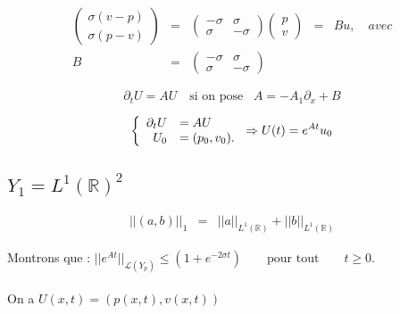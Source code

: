 \documentclass[a4paper,11pt]{article}
\begin{document}
\begin{equation*}
\begin{array}{rclcl}
    \begin{pmatrix}
        \sigma(v-p) \\
        \sigma(p-v)
    \end{pmatrix} &=&
    \begin{pmatrix}
        -\sigma & \sigma \\
        \sigma & -\sigma
    \end{pmatrix}
    \begin{pmatrix}
        p \\
        v
    \end{pmatrix} &=&
    Bu, \quad avec \\
    B &=&
    \begin{pmatrix}
        -\sigma & \sigma \\
        \sigma & -\sigma
    \end{pmatrix} & &
\end{array}
\end{equation*}

\begin{displaymath}
    \partial_t U = AU \,\,\,\,\,\, \mbox{si on pose}\,\,\,\,\, A=-A_1\partial_x + B
\end{displaymath}

\begin{displaymath}
    \left\{
    \begin{array}{rl}
        \partial_t U &=AU\\
        U_0 &=(p_0,v_0).
        \end{array}
    \right.
    \Rightarrow \\
    U(t) = e^{At} u_{0}
\end{displaymath}

\subsection{\( Y_{1} = L^{1}(\mathbb{R})^{2} \)}

\begin{equation*}
\begin{array}{rcl}
    ||(a,b)||_{1} &=& ||a||_{L^{1}(\mathbb{R})} + ||b||_{L^{1}(\mathbb{R})}
\end{array}
\end{equation*}

Montrons que :
\( ||e^{At}||_{\mathcal{L}(Y_p)}\leq (1+e^{-2\sigma t}) \qquad \mbox{pour tout} \qquad t\geq 0. \)\\ \\
On a \( U(x,t)=(p(x,t),v(x,t)) \) \\
\end{document}
